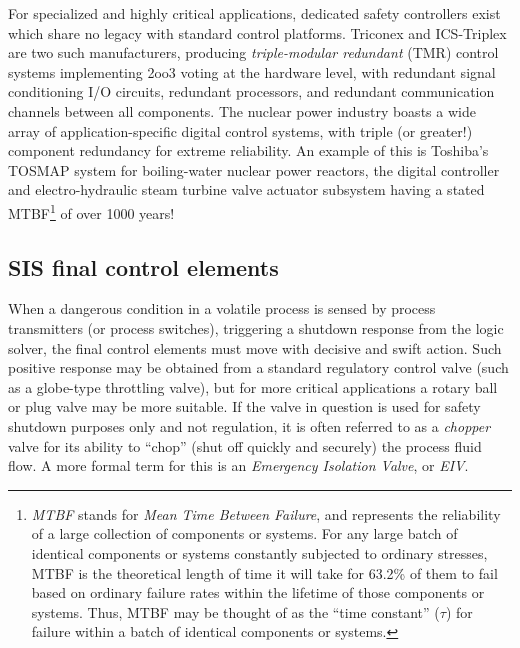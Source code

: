 For specialized and highly critical applications, dedicated safety controllers exist which share no legacy with standard control platforms.  Triconex and ICS-Triplex are two such manufacturers, producing \textit{triple-modular redundant} (TMR) control systems implementing 2oo3 voting at the hardware level, with redundant signal conditioning I/O circuits, redundant processors, and redundant communication channels between all components.  The nuclear power industry boasts a wide array of application-specific digital control systems, with triple (or greater!) component redundancy for extreme reliability.  An example of this is Toshiba's TOSMAP system for boiling-water nuclear power reactors, the digital controller and electro-hydraulic steam turbine valve actuator subsystem having a stated MTBF\footnote{\textit{MTBF} stands for \textit{Mean Time Between Failure}, and represents the reliability of a large collection of components or systems.  For any large batch of identical components or systems constantly subjected to ordinary stresses, MTBF is the theoretical length of time it will take for 63.2\% of them to fail based on ordinary failure rates within the lifetime of those components or systems.  Thus, MTBF may be thought of as the ``time constant'' ($\tau$) for failure within a batch of identical components or systems.} of over 1000 years!      







\filbreak
\subsection{SIS final control elements}

When a dangerous condition in a volatile process is sensed by process transmitters (or process switches), triggering a shutdown response from the logic solver, the final control elements must move with decisive and swift action.  Such positive response may be obtained from a standard regulatory control valve (such as a globe-type throttling valve), but for more critical applications a rotary ball or plug valve may be more suitable.  If the valve in question is used for safety shutdown purposes only and not regulation, it is often referred to as a \textit{chopper} valve for its ability to ``chop'' (shut off quickly and securely) the process fluid flow.  A more formal term for this is an \textit{Emergency Isolation Valve}, or \textit{EIV}.      

